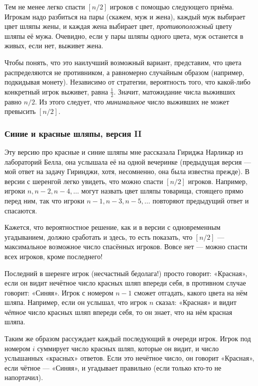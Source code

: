 \medskip

Тем не менее легко спасти $[n/2]$ игроков с помощью следующего приёма.
Игрокам надо разбиться на пары (скажем, муж и жена), каждый муж выбирает цвет шляпы жены, и каждая жена выбирает цвет, \emph{противоположный} цвету шляпы её мужа.
Очевидно, если у пары шляпы одного цвета, муж останется в живых, если нет, выживет жена.

Чтобы понять, что это наилучший возможный вариант, представим, что цвета распределяются не противником, а равномерно случайным образом (например, подкидывая монету).
Независимо от стратегии, вероятность того, что какой-либо конкретный игрок выживет, равна $\tfrac12$.
Значит, матожидание числа выживших равно $n/2$. 
Из этого следует, что \emph{минимальное} число выживших не может превысить $[n/2]$.\heart

\subsubsection*{Синие и красные шляпы, версия II}%

Эту версию про красные и синие шляпы мне рассказала Гириджа Нарликар из лабораторий Белла, %
она услышала её на одной вечеринке (предыдущая версия --- мой ответ на задачу Гиринджи, хотя, несомненно, она была известна прежде).
В версии с шеренгой легко увидеть, что можно спасти $[n/2]$ игроков.
Например, игроки $n, n-2, n-4,\dots$
могут назвать цвет шляпы товарища, стоящего прямо перед ним, так что игроки $n-1, n-3,n-5,\dots$
повторяют предыдущий ответ и спасаются.

\medskip

Кажется, что вероятностное решение, как и в версии с одновременным угадыванием, должно сработать и здесь, то есть показать, что $[n/2]$ --- максимальное возможное число спасённых игроков.
Вовсе нет --- можно спасти всех игроков, кроме последнего!

Последний в шеренге игрок (несчастный бедолага!) просто говорит:
«Красная», если он видит нечётное число красных шляп впереди себя, в противном случае говорит: «Синяя».
Игрок с номером $n-1$ сможет отгадать, какого цвета на нём шляпа.
Например, если он услышал, что игрок $n$ сказал:
«Красная» и видит \emph{чётное} число красных шляп впереди себя, то он знает, что на нём красная шляпа.

Таким же образом рассуждает каждый последующий в очереди игрок.
Игрок под номером $i$ суммирует число красных шляп, которые он видит, и число услышанных «красных» ответов.
Если это нечётное число, он говорит «Красная», если чётное --- «Синяя», и угадывает правильно (если только кто-то не напортачил).

